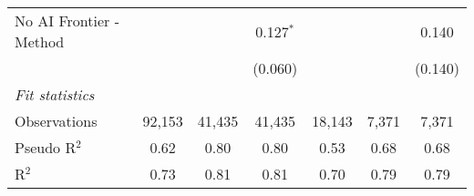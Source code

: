 \begin{tabular}{lcccccc}
   No AI Frontier - Method &               &               & 0.127$^{*}$   &               &               & 0.140\\   
                           &               &               & (0.060)       &               &               & (0.140)\\   
   \midrule
   \emph{Fit statistics}\\
   Observations            & 92,153        & 41,435        & 41,435        & 18,143        & 7,371         & 7,371\\  
   Pseudo R$^2$            & 0.62          & 0.80          & 0.80          & 0.53          & 0.68          & 0.68\\  
   R$^2$                   & 0.73          & 0.81          & 0.81          & 0.70          & 0.79          & 0.79\\  
   

\end{tabular}

